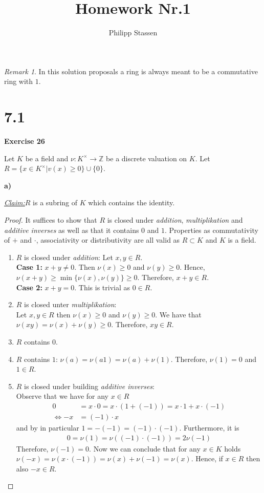 \documentclass{article}
\title{Homework Nr.1}
\author{Philipp Stassen}
\newcommand{\Z}{\mathbb{Z}}
\newcommand{\claim}
{\underline{\textit{Claim:}}\hspace{0,2cm}}
\newcommand{\aufgabe}[1]{
{
	\vspace*{0.5cm}
	\noindent\textsf{\textbf{Exercise #1}}
	\vspace*{0.2cm}

}
}
\newcommand{\teilaufgabe}[1]{
{       

	\noindent\hspace*{0,1 cm}\textbf{#1)}
}
}
\theoremstyle{definition}
\theoremstyle{plain}
\theoremstyle{remark}
\newtheorem*{silentremark}{Remark}
\begin{document}
\maketitle
\begin{silentremark}
	In this solution proposals a ring is always meant to be a commutative ring with $1$.
\end{silentremark}
\section*{7.1}
\aufgabe{26} Let $K$ be a field and $\nu:K^{\times}\rightarrow\Z$ be a discrete valuation on $K$. Let $R = \{x\in K^{\times} | v(x) \geq 0\}\cup \{0\}$.

\teilaufgabe{a} \claim $R$ is a subring of $K$ which contains the identity.
\begin{proof}
	It suffices to show that $R$ is closed under \textit{addition}, \textit{multiplikation} and \textit{additive inverses} as well as that it contains $0$ and $1$. Properties as commutativity of $+$ and $\cdot$, associativity or distributivity are all valid as $R \subset K$ and $K$ is a field.
\begin{enumerate}
	\item $R$ is closed under \textit{addition}:
		Let $x,y\in R$. \\
		\textbf{Case 1:} $x+y \neq 0$. Then $\nu(x)\geq 0$ and $\nu(y)\geq 0$. 
		Hence, $\nu(x+y)\geq \min\{\nu(x),\nu(y)\}\geq 0$. Therefore, $x+y\in R$. \\
		\textbf{Case 2:} $x+y = 0$. This is trivial as $0\in R$.
	\item $R$ is closed unter \textit{multiplikation}:\\
		Let $x,y\in R$ then $\nu(x)\geq 0$ and $\nu(y)\geq 0$. 
		We have that $\nu(xy) = \nu(x) + \nu(y) \geq 0$. Therefore, $xy\in R$.
	\item $R$ contains $0$.
	\item $R$ contains $1$:
		$\nu (a) = \nu (a 1) = \nu(a) +\nu(1)$. Therefore, $\nu(1) = 0$ and $1\in R$.
	\item $R$ is closed under building \textit{additive inverses}: \\
		Observe that we have for any $x\in R$
		\begin{align}
			0 &= x \cdot 0 = x \cdot (1 + (-1)) = x\cdot 1 + x\cdot (-1) \\
			\Longleftrightarrow  -x &= (-1)\cdot x
		\end{align}
		and by in particular $1=-(-1)= (-1)\cdot (-1)$.
		Furthermore, it is
		\begin{align}
			0=\nu(1) = \nu((-1)\cdot (-1)) = 2\nu(-1)
		\end{align}
		Therefore, $\nu(-1)=0$.
		Now we can conclude that for any $x\in K$ holds $\nu(-x) = \nu(x\cdot (-1)) = \nu(x) + \nu(-1) = \nu(x)$. Hence, if $x\in R$ then also $-x\in R$.
\end{enumerate}
\end{proof}
\end{document}
